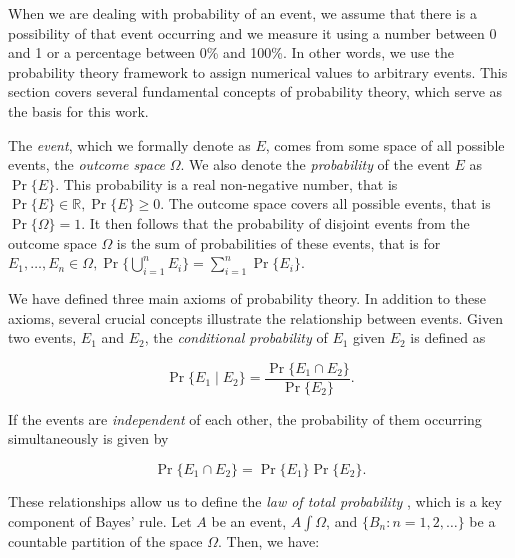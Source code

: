 
\renewcommand{\Pr}[1]{\operatorname{Pr}\{#1\}}

When we are dealing with probability of an event, we assume that there is a possibility
of that event occurring and we measure it using a number between 0 and 1 or a percentage
between 0\% and 100\%. In other words, we use the probability theory framework to assign
numerical values to arbitrary events. This section covers several fundamental concepts of
probability theory, which serve as the basis for this work.

The \textit{event}, which we formally denote as $E$, comes from some space of all possible
events, the \textit{outcome space} $\Omega$. We also denote the \textit{probability} of the
event $E$ as $\Pr{E}$. This probability is a real non-negative number,
that is $\Pr{E} \in \mathbb{R}, \Pr{E} \geq 0$. The outcome
space covers all possible events, that is $\Pr{\Omega} = 1$. It then follows
that the probability of disjoint events from the outcome space $\Omega$ is the sum of
probabilities of these events, that is for
$E_1, \ldots, E_n \in \Omega, \Pr{\bigcup_{i=1}^n E_i} = \sum_{i=1}^n \Pr{E_i}$.

We have defined three main axioms of probability theory. In addition to these axioms, several
crucial concepts illustrate the relationship between events. Given two events, $E_1$ and $E_2$,
the \textit{conditional probability} of $E_1$ given $E_2$ is defined as

$$
\Pr{E_1 \mid E_2} = \frac{\Pr{E_1 \cap E_2}}{\Pr{E_2}}.
$$

If the events are \textit{independent} of each other, the probability of them occurring
simultaneously is given by

$$
\Pr{E_1 \cap E_2} = \Pr{E_1}\Pr{E_2}.
$$

These relationships allow us to define the \textit{law of total probability}
\cite[31]{zwillingerCRCStandardProbability2000}, which is a key component of Bayes' rule.
Let $A$ be an event, $A \int \Omega$, and $\{B_n : n = 1, 2, \ldots\}$ be a countable
partition of the space $\Omega$. Then, we have:

